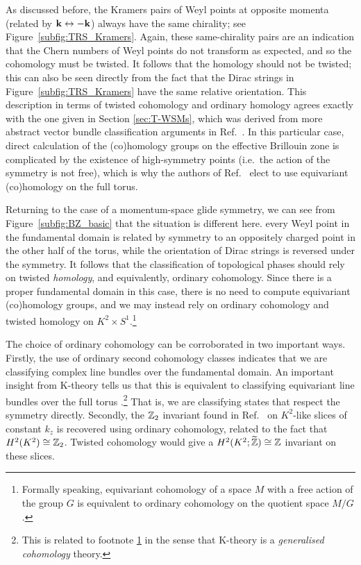 As discussed before,  the Kramers pairs of Weyl points at opposite momenta (related by $\vb{k}\leftrightarrow -\vb{k}$) always have the same chirality; see Figure~\ref{subfig:TRS_Kramers}.  %
Again, these same-chirality pairs are an indication that the Chern numbers of Weyl points do not transform as expected, and so the cohomology must be twisted. It follows that the homology should not be twisted; this can also be seen directly from the fact that the Dirac strings in Figure~\ref{subfig:TRS_Kramers} have the same relative orientation. This description in terms of twisted cohomology and ordinary homology agrees exactly with the one given in Section \ref{sec:T-WSMs}, which was derived from more abstract vector bundle classification arguments in Ref.~\cite{Thiang_equivariant}. In this particular case, direct calculation of the (co)homology groups on the effective Brillouin zone is complicated by the existence of high-symmetry points (i.e.\ the action of the symmetry is not free), which is why the authors of Ref.~\cite{Thiang_equivariant} elect to use equivariant (co)homology on the full torus.

Returning to the case of a momentum-space glide symmetry, we can see from Figure~\ref{subfig:BZ_basic} that the situation is different here.  every Weyl point in the fundamental domain is related by symmetry to an oppositely charged point in the other half of the torus, while the orientation of Dirac strings is reversed under the symmetry. It follows that the classification of topological phases should rely on twisted \emph{homology}, and equivalently, ordinary cohomology. Since there is a proper fundamental domain in this case, there is no need to compute equivariant (co)homology groups, and we may instead rely on ordinary cohomology and twisted homology on $K^2\times S^1$.\footnote{\label{ft:eq_cohom}
	Formally speaking, equivariant cohomology of a space $M$ with a free action of the group $G$ is equivalent to ordinary cohomology on the quotient space $M/G$ \parencite[Cor. 9.6]{Tu_equivariant}.}

The choice of ordinary cohomology can be corroborated in two important ways. Firstly, the use of ordinary second cohomology classes indicates that we are classifying complex line bundles over the fundamental domain. An important insight from K-theory tells us that this is equivalent to classifying equivariant line bundles over the full torus \parencite[Prop. 2.1]{Segal_K-theory}.\footnote{
	This is related to footnote \ref{ft:eq_cohom} in the sense that K-theory is a \emph{generalised cohomology} theory.}
That is, we are classifying states that respect the symmetry directly. Secondly, the $\mathbb{Z}_2$ invariant found in Ref.~\cite{Fonseca-Vaidya_nonorientable} on $K^2$-like slices of constant $k_z$ is recovered using ordinary cohomology, related to the fact that $H^2(K^2)\cong\mathbb{Z}_2$. Twisted cohomology would give a $H^2(K^2;\widetilde{\mathbb{Z}})\cong\mathbb{Z}$ invariant on these slices.

